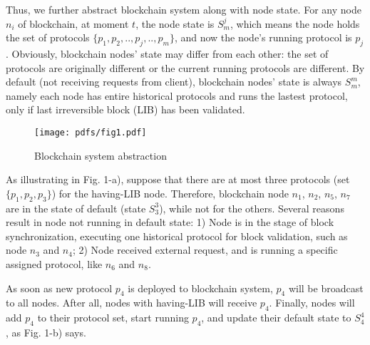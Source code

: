 \documentclass[sigplan,screen]{acmart}
\begin{document}
Thus, we further abstract blockchain system along with node state.
For any node $n_i$ of blockchain, at moment $t$,
the node state is $S_{m}^{j}$, which means the node holds the set of protocols
$\{p_1,p_2,..,p_j,..,p_m\}$, and now the node's running protocol is $p_j$.
Obviously, blockchain nodes' state may differ from each other: the set of
protocols are originally different or the current running protocols are
different. By default (not receiving requests from client),
blockchain nodes' state is always $S_{m}^{m}$, namely each node has entire
historical protocols and runs the lastest protocol, only if last irreversible
block (LIB) has been validated.

\begin{figure}
  \texttt{[image: pdfs/fig1.pdf]}
  \caption{Blockchain system abstraction}
\end{figure}

As illustrating in Fig. 1-a), suppose that there are at most three protocols
(set $\{p_1,p_2,p_3\}$) for the having-LIB node. Therefore,
blockchain node $n_1$, $n_2$, $n_5$, $n_7$ are in the state of default
(state $S_3^3$), while not for the others. Several reasons result in node not
running in default state: 1) Node is in the stage of block synchronization,
executing one historical protocol for block validation, such as node $n_3$ and
$n_4$; 2) Node received external request, and is running a specific assigned
protocol, like $n_6$ and $n_8$.

As soon as new protocol $p_4$ is deployed to blockchain system,
$p_4$ will be broadcast to all nodes. After all, nodes with having-LIB
will receive $p_4$. Finally, nodes will add $p_4$ to their protocol set, start
running $p_4$, and update their default state to $S_4^4$, as Fig. 1-b) says.
\end{document}
